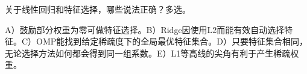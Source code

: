 关于线性回归和特征选择，哪些说法正确？多选。


A）鼓励部分权重为零可做特征选择。B）Ridge因使用L2而能有效自动选择特征。C）OMP能找到给定稀疏度下的全局最优特征集合。D）只要特征集合相同，无论选择方法如何都会得到同一组系数。E）L1等高线的尖角有利于产生稀疏权重。

